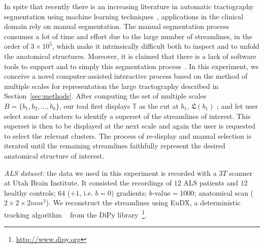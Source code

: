 In spite that recently there is an increasing literature in automatic
tractography segmentation using machine learning techniques~\cite{wang2011tractography,olivetti2011supervised}, applications in the clinical domain rely on manual segmentation. The manual segmentation process consumes a lot of time and effort due to the large number of streamlines, in the order of $3 \times 10^5$, which make it intrinsically difficult both to inspect and to unfold the anatomical structures. Moreover, 
it is claimed that there is a lack of software tools to support and to simply this segmentation process~\cite{olivetti2013fast}. In this experiment, we conceive a novel computer-assisted interactive process based on the method of multiple scales for representation the large tractography described in Section~\ref{sec:methods}. After computing the set of multiple scales $\mathsf{\textit{B}} = \{b_1, b_2, \ldots, b_k\}$, our tool first displays $\mathbb{T}$ as the cut at $b_1$, $\mathfrak{L}(b_1)$
; and let user select some of clusters to identify a superset of the streamlines of interest. This superset is then to be displayed at the next scale and again the user is requested to select the relevant clusters. The process of re-display and manual selection is iterated until the remaining streamlines faithfully represent the desired anatomical structure of interest.

\vspace{0.55mm}
\textit{ALS dataset:}
the data we used in this experiment is recorded with a $3T$ scanner at Utah Brain Institute. It
consisted the recordings of $12$ ALS patients and $12$ healthy
controls; $64$ ($+1$, i.e. $b=0$) gradients; $b$-value$=1000$;
anatomical scan ($2 \times 2 \times 2mm^3$).  We reconstruct the
streamlines using EuDX, a deterministic tracking algorithm
~\cite{garyfallidis2012towards} from the DiPy
library~\footnote{\url{http://www.dipy.org}}. %

